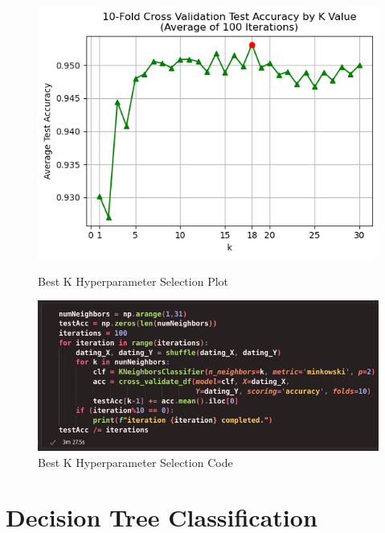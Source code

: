 \documentclass{article}
\begin{document}
    \begin{figure}[H]
        \centering
        \begin{minipage}[t]{0.49\textwidth}
            \centering
            \includegraphics[width=\textwidth, height=0.25\textheight]{k-NN_selection.png}
            \caption{\small{Best K Hyperparameter Selection Plot}}
        \end{minipage}
        \hfill
        \begin{minipage}[t]{0.49\textwidth}
            \centering
            \includegraphics[width=\textwidth, height=0.17\textheight]{k-NN_selection_code.png}
            \caption{\small{Best K Hyperparameter Selection Code}}
        \end{minipage}
    \end{figure}

    \newpage

\section*{Decision Tree Classification}
\end{document}
